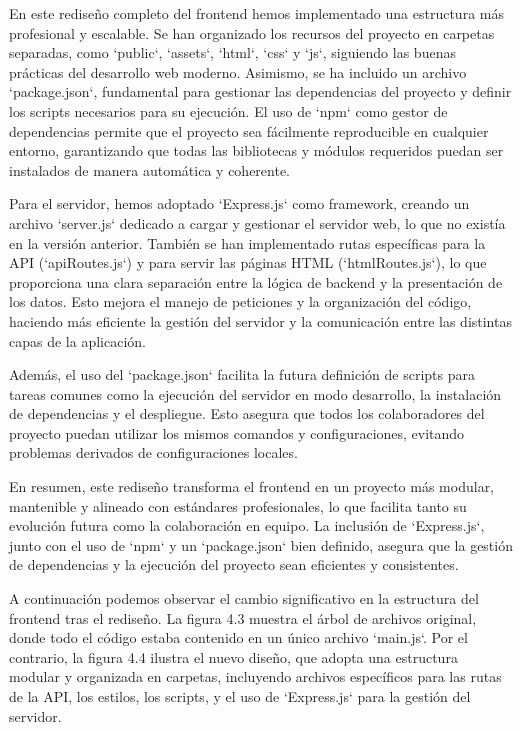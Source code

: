 \documentclass[a4paper, 12pt]{book}
\begin{document}
En este rediseño completo del frontend hemos implementado una estructura más profesional y escalable. Se han organizado los recursos del proyecto en carpetas separadas, como `public`, `assets`, `html`, `css` y `js`, siguiendo las buenas prácticas del desarrollo web moderno. Asimismo, se ha incluido un archivo `package.json`, fundamental para gestionar las dependencias del proyecto y definir los scripts necesarios para su ejecución. El uso de `npm` como gestor de dependencias permite que el proyecto sea fácilmente reproducible en cualquier entorno, garantizando que todas las bibliotecas y módulos requeridos puedan ser instalados de manera automática y coherente.

Para el servidor, hemos adoptado `Express.js` como framework, creando un archivo `server.js` dedicado a cargar y gestionar el servidor web, lo que no existía en la versión anterior. También se han implementado rutas específicas para la API (`apiRoutes.js`) y para servir las páginas HTML (`htmlRoutes.js`), lo que proporciona una clara separación entre la lógica de backend y la presentación de los datos. Esto mejora el manejo de peticiones y la organización del código, haciendo más eficiente la gestión del servidor y la comunicación entre las distintas capas de la aplicación.

Además, el uso del `package.json` facilita la futura definición de scripts para tareas comunes como la ejecución del servidor en modo desarrollo, la instalación de dependencias y el despliegue. Esto asegura que todos los colaboradores del proyecto puedan utilizar los mismos comandos y configuraciones, evitando problemas derivados de configuraciones locales.

En resumen, este rediseño transforma el frontend en un proyecto más modular, mantenible y alineado con estándares profesionales, lo que facilita tanto su evolución futura como la colaboración en equipo. La inclusión de `Express.js`, junto con el uso de `npm` y un `package.json` bien definido, asegura que la gestión de dependencias y la ejecución del proyecto sean eficientes y consistentes.

A continuación podemos observar el cambio significativo en la estructura del frontend tras el rediseño. La figura 4.3 muestra el árbol de archivos original, donde todo el código estaba contenido en un único archivo `main.js`. Por el contrario, la figura 4.4 ilustra el nuevo diseño, que adopta una estructura modular y organizada en carpetas, incluyendo archivos específicos para las rutas de la API, los estilos, los scripts, y el uso de `Express.js` para la gestión del servidor.
\end{document}
